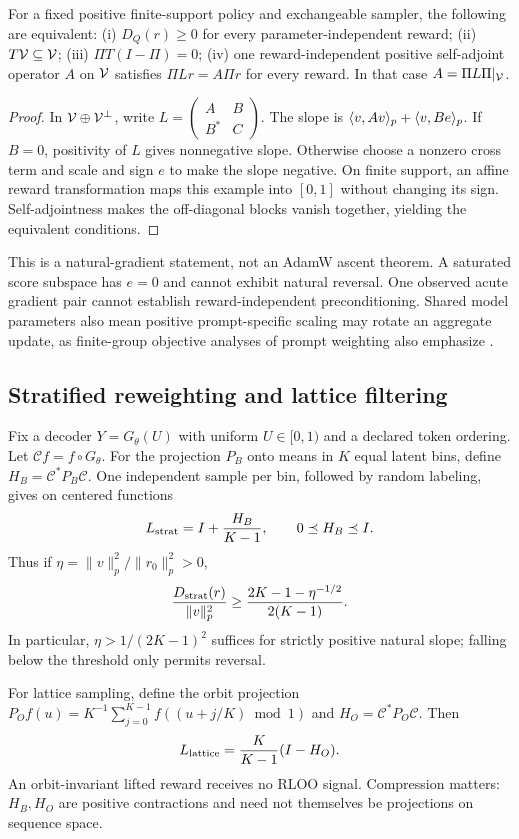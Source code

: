 \begin{theorem}
For a fixed positive finite-support policy and exchangeable sampler, the following
are equivalent: (i) $D_Q(r)\ge0$ for every parameter-independent reward;
(ii) $T\mathcal{V}\subseteq\mathcal{V}$; (iii) $\Pi T(I-\Pi)=0$;
(iv) one reward-independent positive self-adjoint operator $A$ on $\mathcal{V}$ satisfies
$\Pi Lr=A\Pi r$ for every reward. In that case $A=\Pi L\Pi|_{\mathcal{V}}$.
\end{theorem}
\begin{proof}
In $\mathcal{V}\oplus\mathcal{V}^\perp$, write $L=\left(\begin{smallmatrix}A&B\\B^*&C\end{smallmatrix}\right)$.
The slope is $\langle v,Av\rangle_p+\langle v,Be\rangle_p$. If $B=0$, positivity of $L$ gives
nonnegative slope. Otherwise choose a nonzero cross term and scale and sign $e$
to make the slope negative. On finite support, an affine reward transformation
maps this example into $[0,1]$ without changing its sign. Self-adjointness makes
the off-diagonal blocks vanish together, yielding the equivalent conditions.
\end{proof}

This is a natural-gradient statement, not an AdamW ascent theorem. A saturated
score subspace has $e=0$ and cannot exhibit natural reversal. One observed acute
gradient pair cannot establish reward-independent preconditioning. Shared model
parameters also mean positive prompt-specific scaling may rotate an aggregate update,
as finite-group objective analyses of prompt weighting also emphasize
\citep{softmaxgrpo2026}.

\subsection{Stratified reweighting and lattice filtering}
Fix a decoder $Y=G_\theta(U)$ with uniform $U\in[0,1)$ and a declared token ordering.
Let $\mathcal C f=f\circ G_\theta$. For the projection $P_B$ onto means in $K$
equal latent bins, define $H_B=\mathcal C^*P_B\mathcal C$.
One independent sample per bin, followed by random labeling, gives on centered functions
\begin{equation}
L_{\rm strat}=I+\frac{H_B}{K-1},\qquad 0\preceq H_B\preceq I.\label{eq:strat}
\end{equation}
Thus if $\eta=\|v\|_p^2/\|r_0\|_p^2>0$,
\begin{equation}
\frac{D_{\rm strat}(r)}{\|v\|_p^2}
\ge\frac{2K-1-\eta^{-1/2}}{2(K-1)}.\label{eq:bound}
\end{equation}
In particular, $\eta>1/(2K-1)^2$ suffices for strictly positive natural slope;
falling below the threshold only permits reversal.

For lattice sampling, define the orbit projection
$P_Of(u)=K^{-1}\sum_{j=0}^{K-1}f((u+j/K)\bmod1)$ and
$H_O=\mathcal C^*P_O\mathcal C$. Then
\begin{equation}
L_{\rm lattice}=\frac K{K-1}(I-H_O).\label{eq:lattice}
\end{equation}
An orbit-invariant lifted reward receives no RLOO signal. Compression matters:
$H_B,H_O$ are positive contractions and need not themselves be projections on sequence space.

